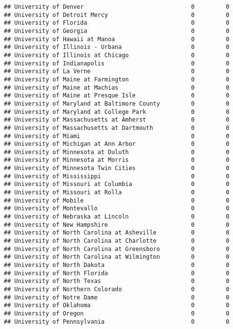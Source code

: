 \documentclass[
]{article}
\begin{document}
\begin{verbatim}
## University of Denver                               0         0
## University of Detroit Mercy                        0         0
## University of Florida                              0         0
## University of Georgia                              0         0
## University of Hawaii at Manoa                      0         0
## University of Illinois - Urbana                    0         0
## University of Illinois at Chicago                  0         0
## University of Indianapolis                         0         0
## University of La Verne                             0         0
## University of Maine at Farmington                  0         0
## University of Maine at Machias                     0         0
## University of Maine at Presque Isle                0         0
## University of Maryland at Baltimore County         0         0
## University of Maryland at College Park             0         0
## University of Massachusetts at Amherst             0         0
## University of Massachusetts at Dartmouth           0         0
## University of Miami                                0         0
## University of Michigan at Ann Arbor                0         0
## University of Minnesota at Duluth                  0         0
## University of Minnesota at Morris                  0         0
## University of Minnesota Twin Cities                0         0
## University of Mississippi                          0         0
## University of Missouri at Columbia                 0         0
## University of Missouri at Rolla                    0         0
## University of Mobile                               0         0
## University of Montevallo                           0         0
## University of Nebraska at Lincoln                  0         0
## University of New Hampshire                        0         0
## University of North Carolina at Asheville          0         0
## University of North Carolina at Charlotte          0         0
## University of North Carolina at Greensboro         0         0
## University of North Carolina at Wilmington         0         0
## University of North Dakota                         0         0
## University of North Florida                        0         0
## University of North Texas                          0         0
## University of Northern Colorado                    0         0
## University of Notre Dame                           0         0
## University of Oklahoma                             0         0
## University of Oregon                               0         0
## University of Pennsylvania                         0         0

\end{verbatim}
\end{document}
